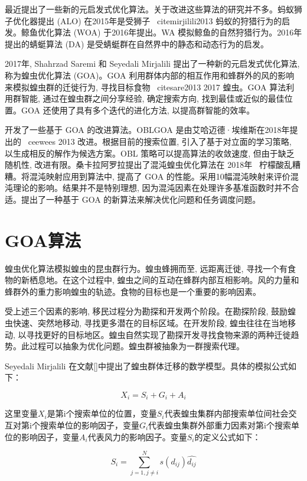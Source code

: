最近提出了一些新的元启发式优化算法。关于改进这些算法的研究并不多。蚂蚁狮子优化器提出 (ALO) 在2015年是受狮子 \ citemirjilili2013 蚂蚁的狩猎行为的启发。鲸鱼优化算法 (WOA) 于2016年提出。WA 模拟鲸鱼的自然狩猎行为。2016年提出的蜻蜓算法 (DA) 是受蜻蜓群在自然界中的静态和动态行为的启发。


2017年, Shahrzad Saremi 和 Seyedali Mirjalili 提出了一种新的元启发式优化算法, 称为蝗虫优化算法 (GOA)。GOA 利用群体内部的相互作用和蜂群外的风的影响来模拟蝗虫群的迁徙行为, 寻找目标食物 \ citesare2013 2017 蝗虫。GOA 算法利用群智能, 通过在蝗虫群之间分享经验, 确定搜索方向, 找到最佳或近似的最佳位置。GOA 还使用了具有多个迭代的进化方法, 以提高群智能的效率。

开发了一些基于 GOA 的改进算法。OBLGOA 是由艾哈迈德·埃维斯在2018年提出的 \ ceewees 2013 改进。根据目前的搜索位置, 引入了基于对立面的学习策略, 以生成相反的解作为候选方案。OBL 策略可以提高算法的收敛速度, 但由于缺乏随机性, 改进有限。桑卡拉阿罗拉提出了混沌蝗虫优化算法在 2018年 \ 柠檬酸乱糟糟。将混沌映射应用到算法中, 提高了 GOA 的性能。采用10幅混沌映射来评价混沌理论的影响。结果并不是特别理想, 因为混沌因素在处理许多基准函数时并不合适。提出了一种基于 GOA 的新算法来解决优化问题和任务调度问题。

\section{GOA算法}

蝗虫优化算法模拟蝗虫的昆虫群行为。蝗虫蜂拥而至, 远距离迁徙, 寻找一个有食物的新栖息地。在这个过程中, 蝗虫之间的互动在蜂群内部互相影响。风的力量和蜂群外的重力影响蝗虫的轨迹。食物的目标也是一个重要的影响因素。

受上述三个因素的影响, 移民过程分为勘探和开发两个阶段。在勘探阶段, 鼓励蝗虫快速、突然地移动, 寻找更多潜在的目标区域。在开发阶段, 蝗虫往往在当地移动, 以寻找更好的目标地区。蝗虫自然实现了勘探开发寻找食物来源的两种迁徙趋势。此过程可以抽象为优化问题。蝗虫群被抽象为一群搜索代理。

Seyedali Mirjalili 在文献[]中提出了蝗虫群体迁移的数学模型。具体的模拟公式如下：

\begin{equation}
    X_i = S_i + G_i + A_i 
\end{equation}

这里变量$X_i$是第i个搜索单位的位置，变量$S_i$代表蝗虫集群内部搜索单位间社会交互对第i个搜索单位的影响因子，变量$G_i$代表蝗虫集群外部重力因素对第i个搜索单位的影响因子，变量$A_i$代表风力的影响因子。变量$S_i$的定义公式如下：

\begin{equation}
    S_i = \sum_{j=1, j\neq{i}}^N s(d_{ij})\widehat{d_{ij}}
\end{equation}

